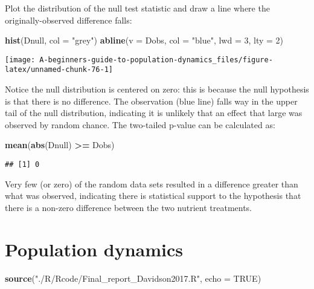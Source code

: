 \documentclass[]{book}
\newenvironment{Shaded}{\begin{snugshade}}{\end{snugshade}}
\newcommand{\DataTypeTok}[1]{\textcolor[rgb]{0.13,0.29,0.53}{#1}}
\newcommand{\DecValTok}[1]{\textcolor[rgb]{0.00,0.00,0.81}{#1}}
\newcommand{\KeywordTok}[1]{\textcolor[rgb]{0.13,0.29,0.53}{\textbf{#1}}}
\newcommand{\NormalTok}[1]{#1}
\newcommand{\OperatorTok}[1]{\textcolor[rgb]{0.81,0.36,0.00}{\textbf{#1}}}
\newcommand{\OtherTok}[1]{\textcolor[rgb]{0.56,0.35,0.01}{#1}}
\newcommand{\StringTok}[1]{\textcolor[rgb]{0.31,0.60,0.02}{#1}}
\begin{document}
Plot the distribution of the null test statistic and draw a line where the originally-observed difference falls:

\begin{Shaded}
\begin{Highlighting}[]
\KeywordTok{hist}\NormalTok{(Dnull, }\DataTypeTok{col =} \StringTok{"grey"}\NormalTok{)}
\KeywordTok{abline}\NormalTok{(}\DataTypeTok{v =}\NormalTok{ Dobs, }\DataTypeTok{col =} \StringTok{"blue"}\NormalTok{, }\DataTypeTok{lwd =} \DecValTok{3}\NormalTok{, }\DataTypeTok{lty =} \DecValTok{2}\NormalTok{)}
\end{Highlighting}
\end{Shaded}

\begin{center}\texttt{[image: A-beginners-guide-to-population-dynamics\_files/figure-latex/unnamed-chunk-76-1]} \end{center}

Notice the null distribution is centered on zero: this is because the null hypothesis is that there is no difference. The observation (blue line) falls way in the upper tail of the null distribution, indicating it is unlikely that an effect that large was observed by random chance. The two-tailed p-value can be calculated as:

\begin{Shaded}
\begin{Highlighting}[]
\KeywordTok{mean}\NormalTok{(}\KeywordTok{abs}\NormalTok{(Dnull) }\OperatorTok{>=}\StringTok{ }\NormalTok{Dobs)}
\end{Highlighting}
\end{Shaded}

\begin{verbatim}
## [1] 0
\end{verbatim}

Very few (or zero) of the random data sets resulted in a difference greater than what was observed, indicating there is statistical support to the hypothesis that there is a non-zero difference between the two nutrient treatments.

\hypertarget{population-dynamics}{%
\section{Population dynamics}\label{population-dynamics}}

\begin{Shaded}
\begin{Highlighting}[]
\KeywordTok{source}\NormalTok{(}\StringTok{"./R/Rcode/Final_report_Davidson2017.R"}\NormalTok{, }\DataTypeTok{echo =} \OtherTok{TRUE}\NormalTok{)}
\end{Highlighting}
\end{Shaded}
\end{document}
